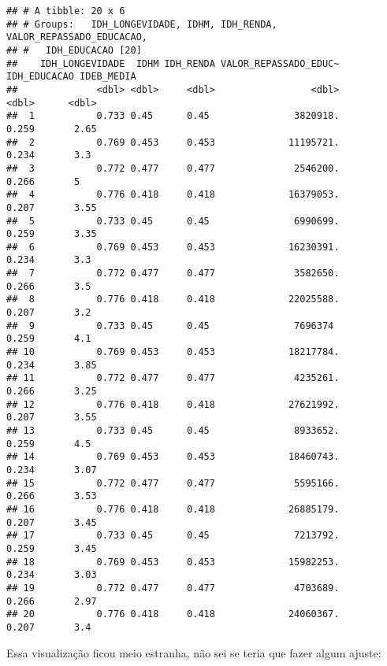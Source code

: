 \documentclass[
]{article}
\newenvironment{Shaded}{\begin{snugshade}}{\end{snugshade}}
\newcommand{\DataTypeTok}[1]{\textcolor[rgb]{0.13,0.29,0.53}{#1}}
\newcommand{\KeywordTok}[1]{\textcolor[rgb]{0.13,0.29,0.53}{\textbf{#1}}}
\newcommand{\NormalTok}[1]{#1}
\newcommand{\OperatorTok}[1]{\textcolor[rgb]{0.81,0.36,0.00}{\textbf{#1}}}
\newcommand{\StringTok}[1]{\textcolor[rgb]{0.31,0.60,0.02}{#1}}
\begin{document}
\begin{verbatim}
## # A tibble: 20 x 6
## # Groups:   IDH_LONGEVIDADE, IDHM, IDH_RENDA, VALOR_REPASSADO_EDUCACAO,
## #   IDH_EDUCACAO [20]
##    IDH_LONGEVIDADE  IDHM IDH_RENDA VALOR_REPASSADO_EDUC~ IDH_EDUCACAO IDEB_MEDIA
##              <dbl> <dbl>     <dbl>                 <dbl>        <dbl>      <dbl>
##  1           0.733 0.45      0.45               3820918.        0.259       2.65
##  2           0.769 0.453     0.453             11195721.        0.234       3.3 
##  3           0.772 0.477     0.477              2546200.        0.266       5   
##  4           0.776 0.418     0.418             16379053.        0.207       3.55
##  5           0.733 0.45      0.45               6990699.        0.259       3.35
##  6           0.769 0.453     0.453             16230391.        0.234       3.3 
##  7           0.772 0.477     0.477              3582650.        0.266       3.5 
##  8           0.776 0.418     0.418             22025588.        0.207       3.2 
##  9           0.733 0.45      0.45               7696374         0.259       4.1 
## 10           0.769 0.453     0.453             18217784.        0.234       3.85
## 11           0.772 0.477     0.477              4235261.        0.266       3.25
## 12           0.776 0.418     0.418             27621992.        0.207       3.55
## 13           0.733 0.45      0.45               8933652.        0.259       4.5 
## 14           0.769 0.453     0.453             18460743.        0.234       3.07
## 15           0.772 0.477     0.477              5595166.        0.266       3.53
## 16           0.776 0.418     0.418             26885179.        0.207       3.45
## 17           0.733 0.45      0.45               7213792.        0.259       3.45
## 18           0.769 0.453     0.453             15982253.        0.234       3.03
## 19           0.772 0.477     0.477              4703689.        0.266       2.97
## 20           0.776 0.418     0.418             24060367.        0.207       3.4
\end{verbatim}

Essa visualização ficou meio estranha, não sei se teria que fazer algum
ajuste:

\begin{Shaded}
\end{Shaded}
\end{document}
